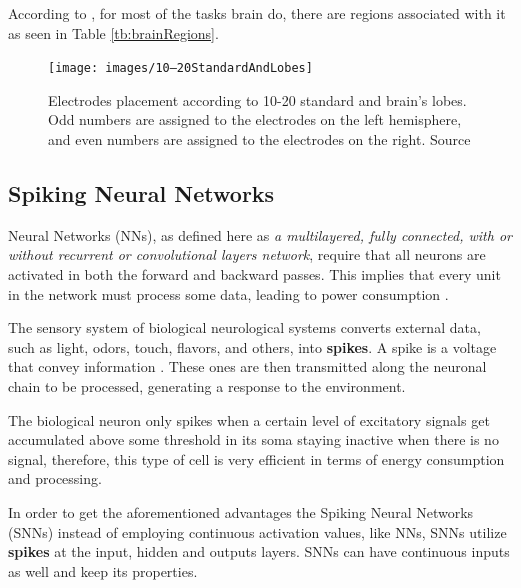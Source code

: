 		\par According to \cite{JALALYBIDGOLY2020101788}, for most of the tasks brain do, there are regions associated with it as seen in Table \ref{tb:brainRegions}.
	
		\begin{figure}[H]
			\centering
			\texttt{[image: images/10–20StandardAndLobes]}
			\caption[10-20 standard and brain lobes]{Electrodes placement according to 10-20 standard \cite{sistema10-20} and brain's lobes. Odd numbers are assigned to the electrodes on the left hemisphere, and even numbers are assigned to the electrodes on the right. Source \cite{JALALYBIDGOLY2020101788}}
			\label{fig:1020standardandlobes}
		\end{figure}
	
	\subsection{Spiking Neural Networks}
	
		\par Neural Networks (NNs), as defined here as \textit{a multilayered, fully connected, with or without recurrent or convolutional layers network}, require that all neurons are activated in both the forward and backward passes. This implies that every unit in the network must process some data, leading to power consumption \cite{10242251}. 

		\par The sensory system of biological neurological systems converts external data, such as light, odors, touch, flavors, and others, into \textbf{spikes}. A spike is a voltage that convey information \cite{kasabov2019time}. These ones are then transmitted along the neuronal chain to be processed, generating a response to the environment.
		
		\par The biological neuron only spikes when a certain level of excitatory signals get accumulated above some threshold in its soma staying inactive when there is no signal, therefore, this type of cell is very efficient in terms of energy consumption and processing.
		
		\par In order to get the aforementioned advantages the Spiking Neural Networks (SNNs) instead of employing continuous activation values, like NNs, SNNs utilize \textbf{spikes} at the input, hidden and outputs layers. SNNs can have continuous inputs as well and keep its properties.
		
